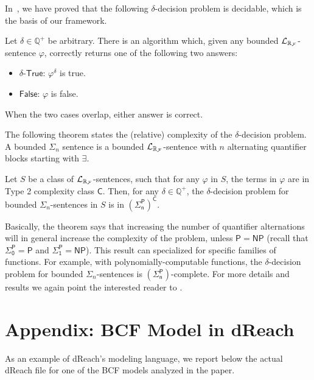 In~\cite{gao12a}, we have proved that the following $\delta$-decision problem is decidable, which is the basis of our framework.
\begin{theorem}\label{delta-decide} Let $\delta\in\mathbb{Q}^+$ be
arbitrary. There is an algorithm which, given any bounded $\mathcal{L}_{\mathbb{R}_{\mathcal{F}}}$-sentence $\varphi$,
correctly returns one of the following two answers:
\begin{itemize}
\item $\delta$-$\mathsf{True}$: $\varphi^{\delta}$ is true.
\item $\mathsf{False}$: $\varphi$ is false.
\end{itemize}
When the two cases overlap, either answer is correct.
\end{theorem}
The following theorem states the (relative) complexity of the $\delta$-decision problem.
A bounded $\Sigma_n$ sentence is a bounded $\mathcal{L}_{\mathbb{R}_{\mathcal{F}}}$-sentence with $n$ alternating quantifier blocks 
starting with $\exists$. 
\begin{theorem}\label{compmain}
Let $S$ be a class of $\mathcal{L}_{\mathbb{R}_{\mathcal{F}}}$-sentences, such that for any $\varphi$ in $S$, the terms in $\varphi$ are in Type 2 complexity class $\mathsf{C}$. Then, for any $\delta\in \mathbb{Q}^+$, the $\delta$-decision problem for bounded $\Sigma_n$-sentences in $S$ is in $\mathsf{(\Sigma_n^P)^C}$.
\end{theorem}
Basically, the theorem says that increasing the number of quantifier alternations will in general increase 
the complexity of the problem, unless $\mathsf{P}=\mathsf{NP}$ (recall that $\mathsf{\Sigma_0^P}=\mathsf{P}$ 
and $\mathsf{\Sigma_1^P}=\mathsf{NP}$).
This result can specialized for specific families of functions. For example, with polynomially-computable 
functions, the $\delta$-decision problem for bounded $\Sigma_n$-sentences is $\mathsf{(\Sigma_n^P)}$-complete.
For more details and results we again point the interested reader to \cite{gao12b}.

\newpage
\section*{Appendix: BCF Model in dReach}
As an example of dReach's modeling language, we report below the actual dReach file for one of 
the BCF models analyzed in the paper.

